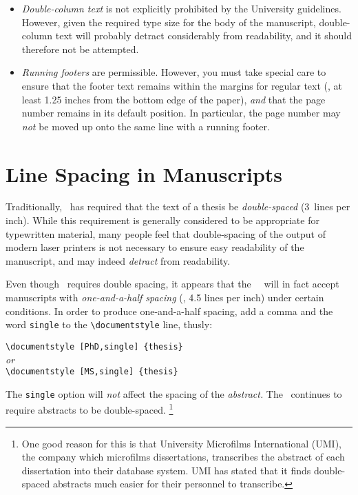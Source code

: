 \begin {itemize}

\item
{\em Double-column text\/}
is not explicitly prohibited by the University guidelines.
However, given the required type size
for the body of the manuscript,
double-column text will probably detract considerably from readability,
and it should therefore not be attempted.

\item
{\em Running footers\/} are permissible.
However, you must take special care to ensure
that the footer text remains within the margins for regular text
(\ie, at least 1.25 inches from the bottom edge of the paper),
{\em and\/} that the page number remains in its default position.
In particular, the page number may {\em not\/} be moved up
onto the same line with a running footer.

\end {itemize}

\section {Line Spacing in Manuscripts}

Traditionally, \ucla\ has required that the text of a thesis
be {\em double-spaced\/} (3~lines per inch).
While this requirement is generally considered
to be appropriate for typewritten material,
many people feel that double-spacing
of the output of modern laser printers
is not necessary to ensure easy readability of the manuscript,
and may indeed {\em detract\/} from readability.

Even though \regs\ requires double spacing,
it appears that the \ucla\ \tdadvisor\ will in fact accept
manuscripts with {\em one-and-a-half spacing\/}
(\ie, 4.5 lines per inch)
under certain conditions.
In order to produce one-and-a-half spacing,
add a comma and the word \verb+single+
to the \verb+\documentstyle+ line, thusly:

\begin {center}
\verb+\documentstyle [PhD,single] {thesis}+ \\
{\em or} \\
\verb+\documentstyle [MS,single] {thesis}+
\end {center}

The \verb+single+ option will {\em not\/} affect the spacing
of the {\em abstract.}
The \tdadvisor\ continues to require abstracts to be double-spaced.%
\footnote {One good reason for this is that University Microfilms
International (UMI), the company which microfilms dissertations,
transcribes the abstract of each dissertation into their database
system.
UMI has stated that it finds double-spaced abstracts
much easier for their personnel to transcribe.}

